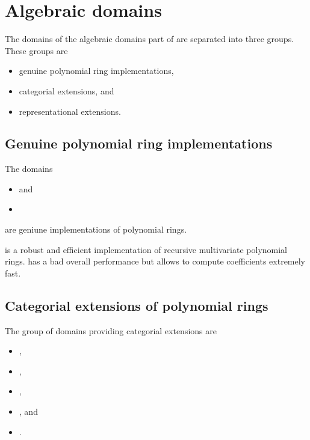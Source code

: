 \clearpage
\section{Algebraic domains}

The domains of the algebraic domains part of \LibCharSet are separated into three groups. These groups are

\begin{itemize}
\item genuine polynomial ring implementations,
\item categorial extensions, and
\item representational extensions.
\end{itemize}





\subsection{Genuine polynomial ring implementations}

The domains
\begin{itemize}
\item {} and
\item {}
\end{itemize}
are geniune implementations of polynomial rings.

 is a robust and efficient implementation of recursive multivariate polynomial rings.  has a bad overall performance but allows to compute coefficients extremely fast. 






\subsection{Categorial extensions of polynomial rings}

The group of domains providing categorial extensions are
\begin{itemize}
\item {},
\item {},
\item {},
\item {}, and
\item {}.
\end{itemize}

